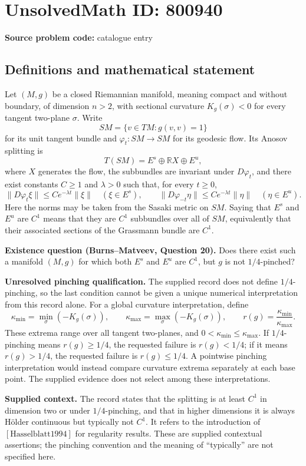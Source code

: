 \documentclass[11pt]{article}
\newcommand{\R}{\mathbb{R}}
\begin{document}
\section*{UnsolvedMath ID: 800940}
\textbf{Source problem code:} catalogue entry
\subsection{Definitions and mathematical statement}
Let \((M,g)\) be a closed Riemannian manifold, meaning compact and without boundary, of dimension \(n>2\), with sectional curvature \(K_g(\sigma)<0\) for every tangent two-plane \(\sigma\). Write
\[
SM=\{v\in TM:g(v,v)=1\}
\]
for its unit tangent bundle and \(\varphi_t:SM\to SM\) for its geodesic flow. Its Anosov splitting is
\[
T(SM)=E^s\oplus\R X\oplus E^u,
\]
where \(X\) generates the flow, the subbundles are invariant under \(D\varphi_t\), and there exist constants \(C\geq1\) and \(\lambda>0\) such that, for every \(t\geq0\),
\[
\|D\varphi_t\xi\|\leq Ce^{-\lambda t}\|\xi\|
\quad(\xi\in E^s),\qquad
\|D\varphi_{-t}\eta\|\leq Ce^{-\lambda t}\|\eta\|
\quad(\eta\in E^u).
\]
Here the norms may be taken from the Sasaki metric on \(SM\). Saying that \(E^s\) and \(E^u\) are \(C^1\) means that they are \(C^1\) subbundles over all of \(SM\), equivalently that their associated sections of the Grassmann bundle are \(C^1\).

\textbf{Existence question (Burns--Matveev, Question 20).} Does there exist such a manifold \((M,g)\) for which both \(E^s\) and \(E^u\) are \(C^1\), but \(g\) is not \(1/4\)-pinched?

\textbf{Unresolved pinching qualification.} The supplied record does not define \(1/4\)-pinching, so the last condition cannot be given a unique numerical interpretation from this record alone. For a global curvature interpretation, define
\[
\kappa_{\min}=\min_{\sigma}(-K_g(\sigma)),\qquad
\kappa_{\max}=\max_{\sigma}(-K_g(\sigma)),\qquad
r(g)=\frac{\kappa_{\min}}{\kappa_{\max}}.
\]
These extrema range over all tangent two-planes, and \(0<\kappa_{\min}\leq\kappa_{\max}\). If \(1/4\)-pinching means \(r(g)\geq1/4\), the requested failure is \(r(g)<1/4\); if it means \(r(g)>1/4\), the requested failure is \(r(g)\leq1/4\). A pointwise pinching interpretation would instead compare curvature extrema separately at each base point. The supplied evidence does not select among these interpretations.

\textbf{Supplied context.} The record states that the splitting is at least \(C^1\) in dimension two or under \(1/4\)-pinching, and that in higher dimensions it is always H\"older continuous but typically not \(C^1\). It refers to the introduction of \([\mathrm{Hasselblatt1994}]\) for regularity results. These are supplied contextual assertions; the pinching convention and the meaning of ``typically'' are not specified here.
\end{document}
